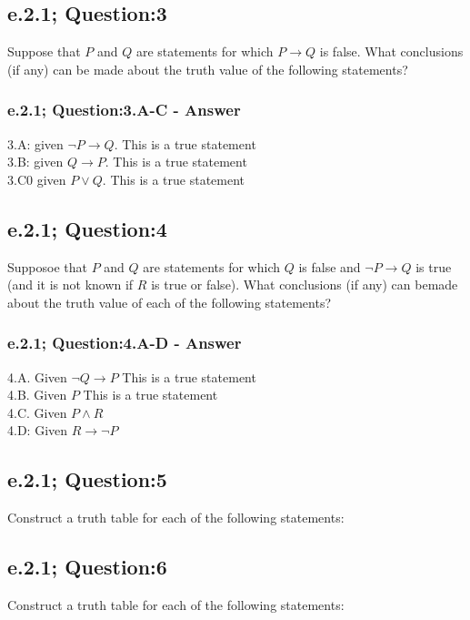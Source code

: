 \subsection{e.2.1; Question:3}
Suppose that $P$ and $Q$ are statements for which $P \to Q$ is false. What conclusions (if any) can be made about the truth value of the following statements?  \\

\subsubsection*{e.2.1; Question:3.A-C - Answer}
3.A: given $\neg P \to Q$. This is a true statement \\
3.B: given $Q \to P$. This is a true statement \\
3.C0 given $P \vee Q$. This is a true statement \\

\subsection{e.2.1; Question:4}
Supposoe that $P$ and $Q$ are statements for which $Q$ is false and $\neg P \to Q$ is true (and it is not known if $R$ is true or false). What conclusions (if any) can bemade about the truth value of each of the following statements?

\subsubsection*{e.2.1; Question:4.A-D - Answer}
4.A. Given $\neg Q \to P$ This is a true statement \\
4.B. Given $P$ This is a true statement \\
4.C. Given $P \wedge R$ \\
4.D: Given $R \to \neg P$ \\

\subsection{e.2.1; Question:5}
Construct a truth table for each of the following statements: \\

\subsection{e.2.1; Question:6}
Construct a truth table for each of the following statements: \\



